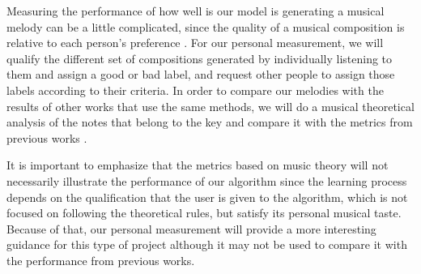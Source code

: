 Measuring the performance of how well is our model is generating a musical melody can be a little complicated, since the quality of a musical composition is relative to each person's preference \cite{biles2013lessons}. For our personal measurement, we will qualify the different set of compositions generated by individually listening to them and assign a good or bad label, and request other people to assign those labels according to their criteria. In order to compare our melodies with the results of other works that use the same methods, we will do a musical theoretical analysis of the notes that belong to the key and compare it with the metrics from previous works \cite{deeprl2016music}.

It is important to emphasize that the metrics based on music theory will not necessarily illustrate the performance of our algorithm since the learning process depends on the qualification that the user is given to the algorithm, which is not focused on following the theoretical rules, but satisfy its personal musical taste. Because of that, our personal measurement will provide a more interesting guidance for this type of project although it may not be used to compare it with the performance from previous works.
